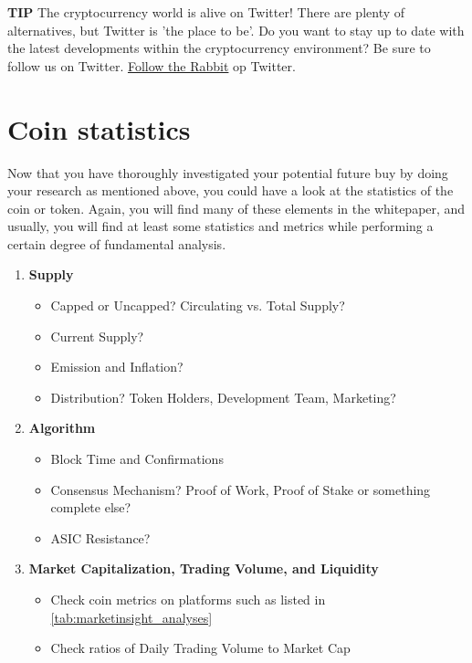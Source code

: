     \bigskip
    \begin{tipbox}{\textbf{TIP}}
        The cryptocurrency world is alive on Twitter! There are plenty of alternatives, but Twitter is 'the place to be'. Do you want to stay up to date with the latest developments within the cryptocurrency environment? Be sure to follow us on Twitter.
        \tcblower
        \href{https://twitter.com/cryptomanuals}{Follow the Rabbit} op Twitter.
    \end{tipbox}

\section{Coin statistics}
Now that you have thoroughly investigated your potential future buy by doing your research as mentioned above, you could have a look at the statistics of the coin or token. Again, you will find many of these elements in the whitepaper, and usually, you will find at least some statistics and metrics while performing a certain degree of fundamental analysis. 

\begin{enumerate}
    \item \textbf{Supply}
    \begin{itemize}
        \item Capped or Uncapped? Circulating vs. Total Supply?
        \item Current Supply?
        \item Emission and Inflation?
        \item Distribution? Token Holders, Development Team, Marketing?
    \end{itemize}
    \item \textbf{Algorithm}
    \begin{itemize}
        \item Block Time and Confirmations
        \item Consensus Mechanism? Proof of Work, Proof of Stake or something complete else?
        \item ASIC Resistance?
    \end{itemize}
    \item \textbf{Market Capitalization, Trading Volume, and Liquidity}
    \begin{itemize}
        \item Check coin metrics on platforms such as listed in \cref{tab:marketinsight_analyses}
        \item Check ratios of Daily Trading Volume to Market Cap
    \end{itemize}
\end{enumerate}


